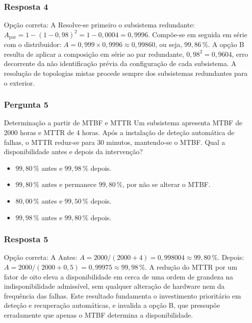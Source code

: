 \documentclass[aspectratio=169]{beamer}
\begin{document}
\begin{frame}
\frametitle{Resposta 4}
\begin{resposta}{Opção correta: A}
Resolve-se primeiro o subsistema redundante: $A_{\text{par}} = 1-(1-0{,}98)^2 = 1-0{,}0004 = 0{,}9996$. Compõe-se em seguida em série com o distribuidor: $A = 0{,}999 \times 0{,}9996 \approx 0{,}99860$, ou seja, $99{,}86\,\%$. A opção B resulta de aplicar a composição em série ao par redundante, $0{,}98^2 = 0{,}9604$, erro decorrente da não identificação prévia da configuração de cada subsistema. A resolução de topologias mistas procede sempre dos subsistemas redundantes para o exterior.
\end{resposta}
\end{frame}

\begin{frame}
\frametitle{Pergunta 5}
\begin{pergunta}{Determinação a partir de MTBF e MTTR}
Um subsistema apresenta MTBF de 2000 horas e MTTR de 4 horas. Após a instalação de deteção automática de falhas, o MTTR reduz-se para 30 minutos, mantendo-se o MTBF. Qual a disponibilidade antes e depois da intervenção?
\begin{itemize}
    \item[A)] $99{,}80\,\%$ antes e $99{,}98\,\%$ depois.
    \item[B)] $99{,}80\,\%$ antes e permanece $99{,}80\,\%$, por não se alterar o MTBF.
    \item[C)] $80{,}00\,\%$ antes e $99{,}50\,\%$ depois.
    \item[D)] $99{,}98\,\%$ antes e $99{,}80\,\%$ depois.
\end{itemize}
\end{pergunta}
\end{frame}

\begin{frame}
\frametitle{Resposta 5}
\begin{resposta}{Opção correta: A}
Antes: $A = 2000/(2000+4) = 0{,}998004 \approx 99{,}80\,\%$. Depois: $A = 2000/(2000+0{,}5) = 0{,}99975 \approx 99{,}98\,\%$. A redução do MTTR por um fator de oito eleva a disponibilidade em cerca de uma ordem de grandeza na indisponibilidade admissível, sem qualquer alteração de hardware nem da frequência das falhas. Este resultado fundamenta o investimento prioritário em deteção e recuperação automáticas, e invalida a opção B, que pressupõe erradamente que apenas o MTBF determina a disponibilidade.
\end{resposta}
\end{frame}
\end{document}
